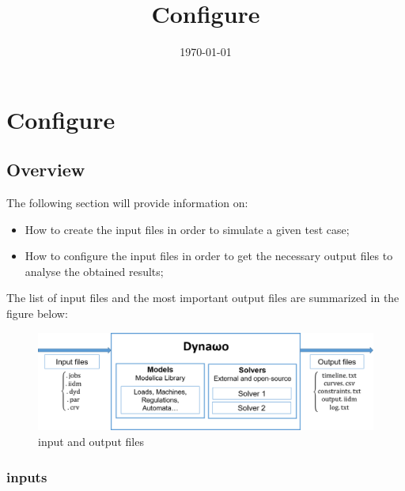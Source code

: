 \documentclass[a4paper, 12pt]{report}
\begin{document}
\title{Configure \Dynawo}
\date\today

\maketitle
\tableofcontents

\chapter[Configure Dynawo]{Configure \Dynawo}

\section{Overview}

The following section will provide information on:
\begin{itemize}
\item How to create the input files in order to simulate a given test case;
\item How to configure the input files in order to get the  necessary output files to analyse the obtained results;
\end{itemize}

The list of input files and the most important output files are summarized in the figure below:

\begin{figure}[h!]
\centering
\includegraphics[width=\textwidth]{../resources/DynawoModelSolver.png}
\caption{\Dynawo input and output files}
\end{figure}

\subsection[Dynawo inputs]{\Dynawo inputs}
\end{document}
